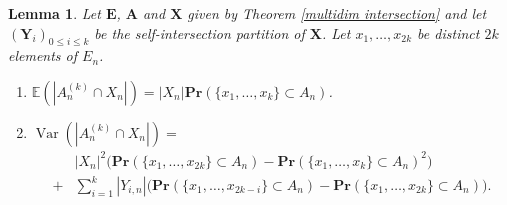 \documentclass{article}
\DeclareMathOperator{\Var}{Var}
\newcommand{\bs}{\boldsymbol}
\def\Pr{\mathbf{Pr}}
\newcommand\esp[1]{\mathbb{E}\left( #1 \right)}
\newtheorem{lem}[thm]{Lemma}
\theoremstyle{remark}
\begin{document}
\begin{lem}\label{multidim E and Var} Let $\bs E$, $\bs A$ and $\bs X$ given by Theorem \ref{multidim intersection} and let $(\bs Y_i)_{0\leq i \leq k}$ be the self-intersection partition of $\bs X$. Let $x_1,\dots,x_{2k}$ be distinct $2k$ elements of $E_n$.
\begin{enumerate}
    \item $\esp{|A_n^{(k)} \cap X_n|} = |X_n|\Pr\left(\{x_1,\dots,x_k\}\subset A_n\right)$.
    \item $\Var\left(|A_n^{(k)} \cap X_n|\right) =$
    \begin{align*}
        & |X_n|^2\Big(\Pr(\{x_1,\dots,x_{2k}\}\subset A_n) - \Pr(\{x_1,\dots,x_{k}\}\subset A_n)^2 \Big)\\
    + & \sum_{i = 1}^{k}|Y_{i,n}| \Big(\Pr(\{x_1,\dots,x_{2k-i}\}\subset A_n) - \Pr(\{x_1,\dots,x_{2k}\}\subset A_n)\Big).
    \end{align*}
\end{enumerate}
\end{lem}
\end{document}
